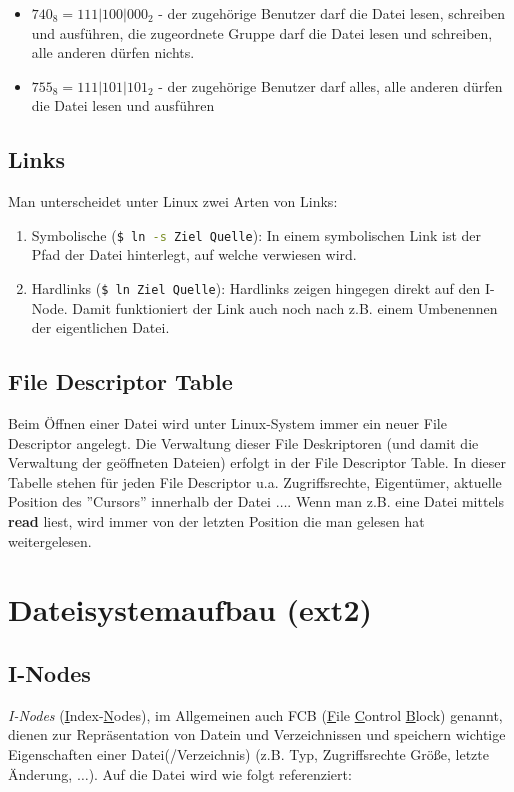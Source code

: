 \documentclass[11pt]{scrartcl}
\begin{document}
\begin{itemize} %
	\item{$740_8=111|100|000_2$ - der zugehörige Benutzer darf die Datei lesen, schreiben und ausführen, die zugeordnete Gruppe darf die Datei lesen und schreiben, alle anderen dürfen nichts.}
	\item{$755_8=111|101|101_2$ - der zugehörige Benutzer darf alles, alle anderen dürfen die Datei lesen und ausführen}
\end{itemize}

\subsection{Links}
Man unterscheidet unter Linux zwei Arten von Links:

\begin{enumerate}
	\item{Symbolische (\lstinline[language=Bash]{$ ln -s Ziel Quelle}): In einem symbolischen Link ist der Pfad der Datei hinterlegt, auf welche verwiesen wird.}
	\item{Hardlinks (\lstinline[language=Bash]{$ ln Ziel Quelle}): Hardlinks zeigen hingegen direkt auf den I-Node. Damit funktioniert der Link auch noch nach z.B. einem Umbenennen der eigentlichen Datei.}
\end{enumerate}

\subsection{File Descriptor Table}
Beim Öffnen einer Datei wird unter Linux-System immer ein neuer File Descriptor angelegt. Die Verwaltung dieser File Deskriptoren (und damit die Verwaltung der geöffneten Dateien) erfolgt in der File Descriptor Table. In dieser Tabelle stehen für jeden File Descriptor u.a. Zugriffsrechte, Eigentümer, aktuelle Position des ''Cursors'' innerhalb der Datei $\ldots$. Wenn man z.B. eine Datei mittels \textbf{read} liest, wird immer von der letzten Position die man gelesen hat weitergelesen.

\section{Dateisystemaufbau (ext2)}
\subsection{I-Nodes}
\textit{I-Nodes} (\underline Index-\underline Nodes), im Allgemeinen auch FCB (\underline File \underline Control \underline Block) genannt, dienen zur Repräsentation von Datein und Verzeichnissen und speichern wichtige Eigenschaften einer Datei(/Verzeichnis) (z.B. Typ, Zugriffsrechte Größe, letzte Änderung, $\ldots$). Auf die Datei wird wie folgt referenziert:
\end{document}

